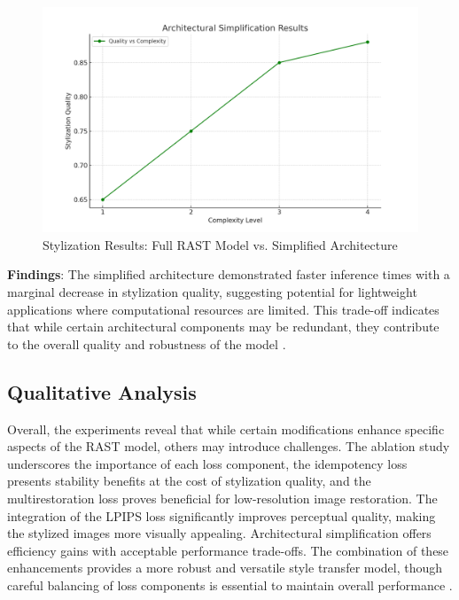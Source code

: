 \documentclass{article}
\begin{document}
\begin{figure}[ht]
    \centering
    \includegraphics[width=\linewidth]{figures/architecture_simplification.png}
    \caption{Stylization Results: Full RAST Model vs. Simplified Architecture}
    \label{fig:architecture_simplification}
\end{figure}

\textbf{Findings}: The simplified architecture demonstrated faster inference times with a marginal decrease in stylization quality, suggesting potential for lightweight applications where computational resources are limited. This trade-off indicates that while certain architectural components may be redundant, they contribute to the overall quality and robustness of the model \cite{Vazquez2018, Fernandez2019}.

\subsection{Qualitative Analysis}
Overall, the experiments reveal that while certain modifications enhance specific aspects of the RAST model, others may introduce challenges. The ablation study underscores the importance of each loss component, the idempotency loss presents stability benefits at the cost of stylization quality, and the multirestoration loss proves beneficial for low-resolution image restoration. The integration of the LPIPS loss significantly improves perceptual quality, making the stylized images more visually appealing. Architectural simplification offers efficiency gains with acceptable performance trade-offs. The combination of these enhancements provides a more robust and versatile style transfer model, though careful balancing of loss components is essential to maintain overall performance \cite{He2016, Karras2020}.
\end{document}
